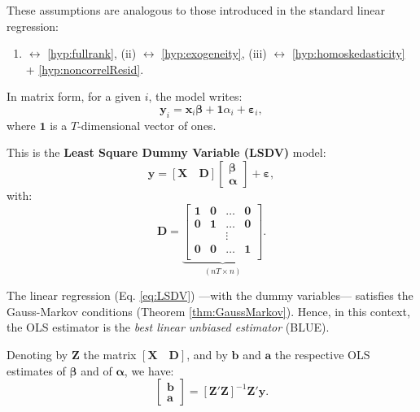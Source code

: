 \documentclass[
  12pt,
]{book}
\providecommand{\tightlist}{%
  \setlength{\itemsep}{0pt}\setlength{\parskip}{0pt}}
\theoremstyle{definition}
\theoremstyle{definition}
\theoremstyle{definition}
\theoremstyle{definition}
\theoremstyle{remark}
\begin{document}
These assumptions are analogous to those introduced in the standard linear regression:

\begin{enumerate}
\def\labelenumi{(\roman{enumi})}
\tightlist
\item
  \(\leftrightarrow\) \ref{hyp:fullrank}, (ii) \(\leftrightarrow\) \ref{hyp:exogeneity}, (iii) \(\leftrightarrow\) \ref{hyp:homoskedasticity} + \ref{hyp:noncorrelResid}.
\end{enumerate}

In matrix form, for a given \(i\), the model writes:
\[
\mathbf{y}_i = \mathbf{x}_i \boldsymbol\beta + \mathbf{1}\alpha_i + \boldsymbol\varepsilon_i,
\]
where \(\mathbf{1}\) is a \(T\)-dimensional vector of ones.

This is the \textbf{Least Square Dummy Variable (LSDV)} model:
\begin{equation}
\mathbf{y} = [\mathbf{X} \quad \mathbf{D}]
\left[
\begin{array}{c}
\boldsymbol\beta\\
\boldsymbol\alpha
\end{array}
\right]
+ \boldsymbol\varepsilon, \label{eq:LSDV}
\end{equation}
with:
\[
\mathbf{D} = \underbrace{ \left[\begin{array}{cccc}
\mathbf{1}&\mathbf{0}&\dots&\mathbf{0}\\
\mathbf{0}&\mathbf{1}&\dots&\mathbf{0}\\
&&\vdots&\\
\mathbf{0}&\mathbf{0}&\dots&\mathbf{1}\\
\end{array}\right]}_{(nT \times n)}.
\]

The linear regression (Eq. \eqref{eq:LSDV}) ---with the dummy variables--- satisfies the Gauss-Markov conditions (Theorem \ref{thm:GaussMarkov}). Hence, in this context, the OLS estimator is the \emph{best linear unbiased estimator} (BLUE).

Denoting by \(\mathbf{Z}\) the matrix \([\mathbf{X} \quad \mathbf{D}]\), and by \(\mathbf{b}\) and \(\mathbf{a}\) the respective OLS estimates of \(\boldsymbol\beta\) and of \(\boldsymbol\alpha\), we have:
\begin{equation}
\boxed{
\left[
\begin{array}{c}
\mathbf{b}\\
\mathbf{a}
\end{array}
\right]
= [\mathbf{Z}'\mathbf{Z}]^{-1}\mathbf{Z}'\mathbf{y}.} \label{eq:bfixedeffects11}
\end{equation}
\end{document}
